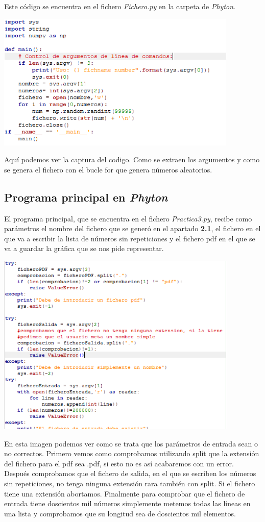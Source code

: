 \documentclass{article}
\begin{document}
Este código se encuentra en el fichero \textit{Fichero.py} en la carpeta de \textit{Phyton}.

\includegraphics[width=11.5cm]{Fichero.png}

Aquí podemos ver la captura del codigo. Como se extraen los argumentos y como se genera el fichero con el bucle for que genera números aleatorios.

\subsection{Programa principal en \textit{Phyton}}
El programa principal, que se encuentra en el fichero \textit{Practica3.py}, recibe como parámetros el nombre del fichero que se generó en el apartado \textbf{2.1}, el fichero en el que va a escribir la lista de números sin repeticiones y el fichero pdf en el que se va a guardar la gráfica que se nos pide representar.

\includegraphics[width=11.5cm]{Tratamiento_Errores.PNG}

En esta imagen podemos ver como se trata que los parámetros de entrada sean o no correctos. Primero vemos como comprobamos utilizando split que la extensión del fichero para el pdf sea .pdf, si esto no es así acabaremos con un error. Después comprobamos que el fichero de salida, en el que se escriben los números sin repeticiones, no tenga ninguna extensión rara también con split. Si el fichero tiene una extensión abortamos. Finalmente para comprobar que el fichero de entrada tiene doscientos mil números simplemente metemos todas las líneas en una lista y comprobamos que su longitud sea de doscientos mil elementos.
\end{document}
